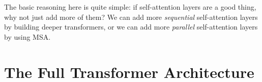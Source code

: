 The basic reasoning here is quite simple: if self-attention layers are a good thing, why not just add more of them? We can add more \textit{sequential} self-attention layers by building deeper transformers, or we can add more \textit{parallel} self-attention layers by using MSA.

\section{The Full Transformer Architecture}\label{sec:transformers:ViT_arch}


